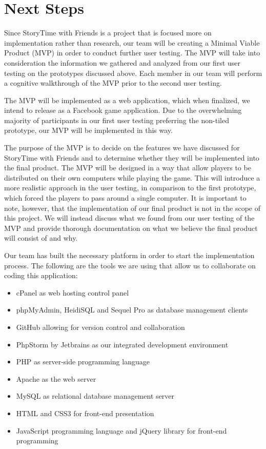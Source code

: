\documentclass{sigchi}
\begin{document}
\section{Next Steps}

Since StoryTime with Friends is a project that is focused more on implementation rather than research, our team will be creating a Minimal Viable Product (MVP) in order to conduct further user testing. The MVP will take into consideration the information we gathered and analyzed from our first user testing on the prototypes discussed above. Each member in our team will perform a cognitive walkthrough of the MVP prior to the second user testing.

The MVP will be implemented as a web application, which when finalized, we intend to release as a Facebook game application. Due to the overwhelming majority of participants in our first user testing preferring the non-tiled prototype, our MVP will be implemented in this way. 

The purpose of the MVP is to decide on the features we have discussed for StoryTime with Friends and to determine whether they will be implemented into the final product. The MVP will be designed in a way that allow players to be distributed on their own computers while playing the game. This will introduce a more realistic approach in the user testing, in comparison to the first prototype, which forced the players to pass around a single computer. It is important to note, however, that the implementation of our final product is not in the scope of this project. We will instead discuss what we found from our user testing of the MVP and provide thorough documentation on what we believe the final product will consist of and why.

Our team has built the necessary platform in order to start the implementation process. The following are the tools we are using that allow us to collaborate on coding this application:

\begin{itemize}[leftmargin=.5in,nosep]
\item cPanel as web hosting control panel
\item phpMyAdmin, HeidiSQL and Sequel Pro as database management clients
\item GitHub allowing for version control and collaboration
\item PhpStorm by Jetbrains as our integrated development environment
\item PHP as server-side programming language
\item Apache as the web server
\item MySQL as relational database management server
\item HTML and CSS3 for front-end presentation
\item JavaScript programming language and jQuery library for front-end programming
\end{itemize}
\end{document}
